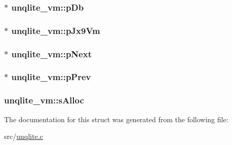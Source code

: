\hypertarget{structunqlite__vm_a17c687ba904d5c928e79299f4b53f921}{
\subsubsection[{p\-Db}]{$\ast$ unqlite\-\_\-vm\-::p\-Db}}\label{dd/d56/structunqlite__vm_a17c687ba904d5c928e79299f4b53f921}
\hypertarget{structunqlite__vm_ac1112bdb8f71043546eea907768b9048}{
\subsubsection[{p\-Jx9\-Vm}]{$\ast$ unqlite\-\_\-vm\-::p\-Jx9\-Vm}}\label{dd/d56/structunqlite__vm_ac1112bdb8f71043546eea907768b9048}
\hypertarget{structunqlite__vm_a255bc025d2b6fb9d23a2e18436ee6bad}{
\subsubsection[{p\-Next}]{$\ast$ unqlite\-\_\-vm\-::p\-Next}}\label{dd/d56/structunqlite__vm_a255bc025d2b6fb9d23a2e18436ee6bad}
\hypertarget{structunqlite__vm_ad81bc194ac881691c77a99816c6a5779}{
\subsubsection[{p\-Prev}]{ $\ast$ unqlite\-\_\-vm\-::p\-Prev}}\label{dd/d56/structunqlite__vm_ad81bc194ac881691c77a99816c6a5779}
\hypertarget{structunqlite__vm_a222dae15f7d9a3e5c528e2c2a1da8643}{
\subsubsection[{s\-Alloc}]{ unqlite\-\_\-vm\-::s\-Alloc}}\label{dd/d56/structunqlite__vm_a222dae15f7d9a3e5c528e2c2a1da8643}


The documentation for this struct was generated from the following file\-:\begin{DoxyCompactItemize}
\item 
src/\hyperlink{unqlite_8c}{unqlite.\-c}\end{DoxyCompactItemize}
